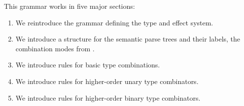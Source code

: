 \documentclass[math, english, info]{beamercours}
\begin{document}
\begin{frame}[allowframebreaks]
	This grammar works in five major sections:
	\begin{enumerate}
		\item We reintroduce the grammar defining the type and effect system.
		\item We introduce a structure for the semantic parse trees and their labels,
		      the combination modes from
		      \cite{bumfordEffectdrivenInterpretationFunctors2025}.
		\item We introduce rules for basic type combinations.
		\item We introduce rules for higher-order unary type combinators.
		\item We introduce rules for higher-order binary type combinators.
	\end{enumerate}
\end{frame}
\end{document}
